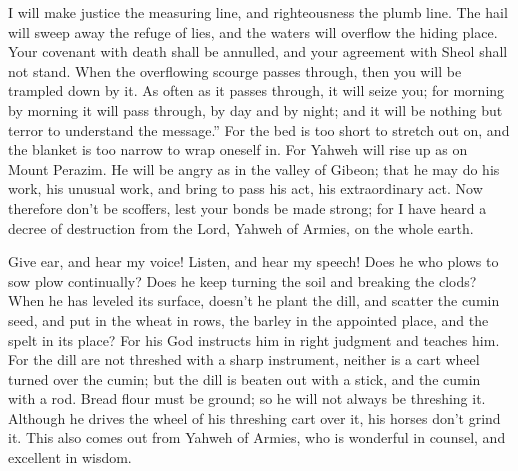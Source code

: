 {I will make justice the measuring line, and righteousness the plumb line. The hail will sweep away the refuge of lies, and the waters will overflow the hiding place.
Your covenant with death shall be annulled, and your agreement with Sheol
 shall not stand. When the overflowing scourge passes through, then you will be trampled down by it.
As often as it passes through, it will seize you; for morning by morning it will pass through, by day and by night; and it will be nothing but terror to understand the message.”
For the bed is too short to stretch out on, and the blanket is too narrow to wrap oneself in.
For Yahweh will rise up as on Mount Perazim. He will be angry as in the valley of Gibeon; that he may do his work, his unusual work, and bring to pass his act, his extraordinary act.
Now therefore don’t be scoffers, lest your bonds be made strong; for I have heard a decree of destruction from the Lord, Yahweh of Armies, on the whole earth.
\par }{\PP {}Give ear, and hear my voice! Listen, and hear my speech!
Does he who plows to sow plow continually? Does he keep turning the soil and breaking the clods?
When he has leveled its surface, doesn’t he plant the dill, and scatter the cumin seed, and put in the wheat in rows, the barley in the appointed place, and the spelt in its place?
For his God instructs him in right judgment and teaches him.
For the dill are not threshed with a sharp instrument, neither is a cart wheel turned over the cumin; but the dill is beaten out with a stick, and the cumin with a rod.
Bread flour must be ground; so he will not always be threshing it. Although he drives the wheel of his threshing cart over it, his horses don’t grind it.
This also comes out from Yahweh of Armies, who is wonderful in counsel, and excellent in wisdom.

}
